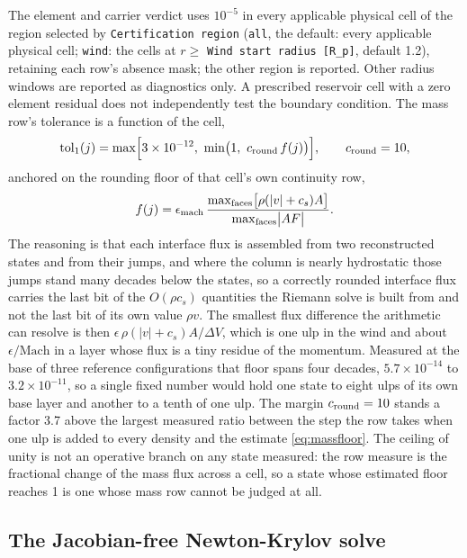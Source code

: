 The element and carrier verdict uses $10^{-5}$ in every applicable
physical cell of the region selected by \texttt{Certification region}
(\texttt{all}, the default: every applicable physical cell; \texttt{wind}: the
cells at $r\ge$ \texttt{Wind start radius [R\_p]}, default 1.2), retaining
each row's absence mask; the other region is reported. Other radius windows are
reported as diagnostics only. A prescribed
reservoir cell with a zero element residual does not independently test
the boundary condition. The mass row's tolerance is a function of the cell,
%
\begin{equation}
  \mathrm{tol}_1(j) = \max\Bigl[3\times10^{-12},\
                         \min\bigl(1,\ c_{\rm round}\,f(j)\bigr)\Bigr],
  \qquad c_{\rm round} = 10,
  \label{eq:masstol}
\end{equation}
%
anchored on the rounding floor of that cell's own continuity row,
%
\begin{equation}
  f(j) = \epsilon_{\rm mach}\,
         \frac{\max_{\rm faces}\bigl[\rho(|v| + c_s)A\bigr]}
              {\max_{\rm faces}\bigl|A F\bigr|}.
  \label{eq:massfloor}
\end{equation}
%
The reasoning is that each interface flux is assembled from two reconstructed
states and from their jumps, and where the column is nearly hydrostatic those
jumps stand many decades below the states, so a correctly rounded interface
flux carries the last bit of the $O(\rho c_s)$ quantities the Riemann solve is
built from and not the last bit of its own value $\rho v$.  The smallest flux
difference the arithmetic can resolve is then
$\epsilon\,\rho(|v|+c_s)A/\Delta V$, which is one ulp in the wind and about
$\epsilon/\mathrm{Mach}$ in a layer whose flux is a tiny residue of the
momentum.  Measured at the base of three reference configurations that floor
spans four decades, $5.7\times10^{-14}$ to $3.2\times10^{-11}$, so a single
fixed number would hold one state to eight ulps of its own base layer and
another to a tenth of one ulp.  The margin $c_{\rm round} = 10$ stands a
factor 3.7 above the largest measured ratio between the step the row takes
when one ulp is added to every density and the estimate \eqref{eq:massfloor}.
The ceiling of unity is not an operative branch on any state measured: the row
measure is the fractional change of the mass flux across a cell, so a state
whose estimated floor reaches 1 is one whose mass row cannot be judged at
all.

\subsection{The Jacobian-free Newton-Krylov solve}
\label{sec:steady:jfnk}

